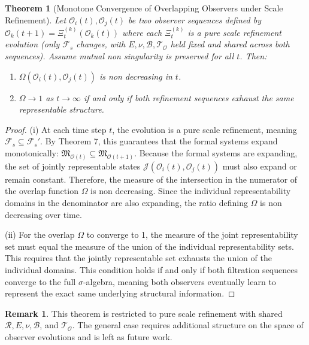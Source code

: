 \documentclass[12pt]{article}
\newtheorem{theorem}{Theorem}
\theoremstyle{definition}
\newtheorem{remark}{Remark}
\begin{document}
\begin{theorem}[Monotone Convergence of Overlapping Observers under Scale Refinement]
Let $\mathcal{O}_i(t), \mathcal{O}_j(t)$ be two observer sequences defined by $\mathcal{O}_k(t+1) = \Xi_t^{(k)}(\mathcal{O}_k(t))$ where each $\Xi_t^{(k)}$ is a pure scale refinement evolution (only $\mathcal{F}_s$ changes, with $E, \nu, \mathcal{B}, \mathcal{T}_{\mathcal{O}}$ held fixed and shared across both sequences). Assume mutual non singularity is preserved for all $t$. Then:
\begin{enumerate}[label=(\roman*)]
    \item $\Omega(\mathcal{O}_i(t), \mathcal{O}_j(t))$ is non decreasing in $t$.
    \item $\Omega \to 1$ as $t \to \infty$ if and only if both refinement sequences exhaust the same representable structure.
\end{enumerate}
\end{theorem}
\begin{proof}
(i) At each time step $t$, the evolution is a pure scale refinement, meaning $\mathcal{F}_s \subseteq \mathcal{F}_s'$. By Theorem 7, this guarantees that the formal systems expand monotonically: $\mathfrak{M}_{\mathcal{O}(t)} \subseteq \mathfrak{M}_{\mathcal{O}(t+1)}$. Because the formal systems are expanding, the set of jointly representable states $\mathcal{J}(\mathcal{O}_i(t), \mathcal{O}_j(t))$ must also expand or remain constant. Therefore, the measure of the intersection in the numerator of the overlap function $\Omega$ is non decreasing. Since the individual representability domains in the denominator are also expanding, the ratio defining $\Omega$ is non decreasing over time.

(ii) For the overlap $\Omega$ to converge to 1, the measure of the joint representability set must equal the measure of the union of the individual representability sets. This requires that the jointly representable set exhausts the union of the individual domains. This condition holds if and only if both filtration sequences converge to the full $\sigma$-algebra, meaning both observers eventually learn to represent the exact same underlying structural information.
\end{proof}

\begin{remark}
This theorem is restricted to pure scale refinement with shared $\mathcal{R}, E, \nu, \mathcal{B}$, and $\mathcal{T}_{\mathcal{O}}$. The general case requires additional structure on the space of observer evolutions and is left as future work.
\end{remark}
\end{document}
